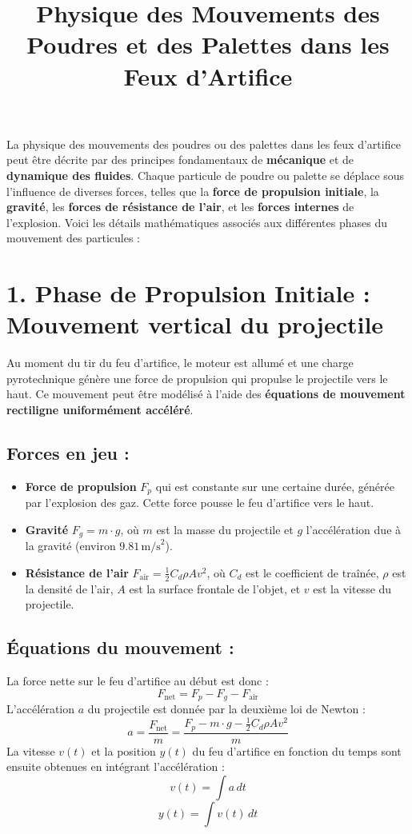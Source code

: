 \documentclass[12pt]{article}
\title{Physique des Mouvements des Poudres et des Palettes dans les Feux d'Artifice}
\author{}
\date{}
\begin{document}
\maketitle

La physique des mouvements des poudres ou des palettes dans les feux d'artifice peut être décrite par des principes fondamentaux de \textbf{mécanique} et de \textbf{dynamique des fluides}. Chaque particule de poudre ou palette se déplace sous l'influence de diverses forces, telles que la \textbf{force de propulsion initiale}, la \textbf{gravité}, les \textbf{forces de résistance de l'air}, et les \textbf{forces internes} de l'explosion. Voici les détails mathématiques associés aux différentes phases du mouvement des particules :

\section*{1. Phase de Propulsion Initiale : Mouvement vertical du projectile}

Au moment du tir du feu d'artifice, le moteur est allumé et une charge pyrotechnique génère une force de propulsion qui propulse le projectile vers le haut. Ce mouvement peut être modélisé à l’aide des \textbf{équations de mouvement rectiligne uniformément accéléré}.

\subsection*{Forces en jeu :}
\begin{itemize}
  \item \textbf{Force de propulsion} \( F_p \) qui est constante sur une certaine durée, générée par l'explosion des gaz. Cette force pousse le feu d'artifice vers le haut.
  \item \textbf{Gravité} \( F_g = m \cdot g \), où \( m \) est la masse du projectile et \( g \) l'accélération due à la gravité (environ \( 9.81 \, \text{m/s}^2 \)).
  \item \textbf{Résistance de l'air} \( F_{\text{air}} = \frac{1}{2} C_d \rho A v^2 \), où \( C_d \) est le coefficient de traînée, \( \rho \) est la densité de l'air, \( A \) est la surface frontale de l'objet, et \( v \) est la vitesse du projectile.
\end{itemize}

\subsection*{Équations du mouvement :}
La force nette sur le feu d'artifice au début est donc :
\[
F_{\text{net}} = F_p - F_g - F_{\text{air}}
\]
L'accélération \( a \) du projectile est donnée par la deuxième loi de Newton :
\[
a = \frac{F_{\text{net}}}{m} = \frac{F_p - m \cdot g - \frac{1}{2} C_d \rho A v^2}{m}
\]
La vitesse \( v(t) \) et la position \( y(t) \) du feu d'artifice en fonction du temps sont ensuite obtenues en intégrant l’accélération :
\[
v(t) = \int a \, dt
\]
\[
y(t) = \int v(t) \, dt
\]
\end{document}
